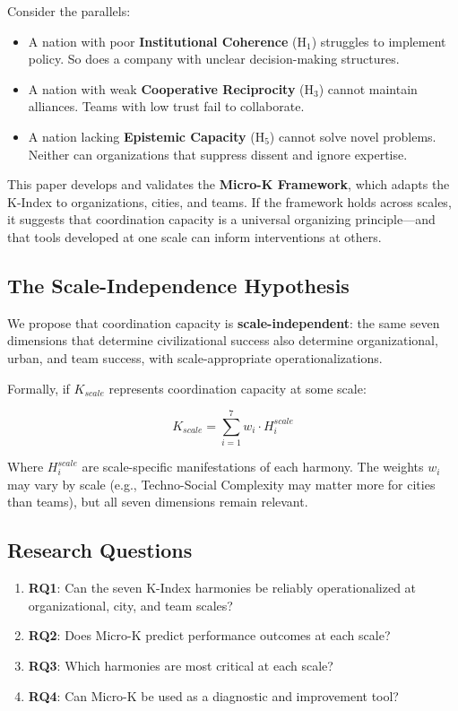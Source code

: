 \documentclass[12pt,a4paper]{article}
\begin{document}
Consider the parallels:

\begin{itemize}
    \item A nation with poor \textbf{Institutional Coherence} (H$_1$) struggles to implement policy. So does a company with unclear decision-making structures.
    \item A nation with weak \textbf{Cooperative Reciprocity} (H$_3$) cannot maintain alliances. Teams with low trust fail to collaborate.
    \item A nation lacking \textbf{Epistemic Capacity} (H$_5$) cannot solve novel problems. Neither can organizations that suppress dissent and ignore expertise.
\end{itemize}

This paper develops and validates the \textbf{Micro-K Framework}, which adapts the K-Index to organizations, cities, and teams. If the framework holds across scales, it suggests that coordination capacity is a universal organizing principle---and that tools developed at one scale can inform interventions at others.

\subsection{The Scale-Independence Hypothesis}

We propose that coordination capacity is \textbf{scale-independent}: the same seven dimensions that determine civilizational success also determine organizational, urban, and team success, with scale-appropriate operationalizations.

Formally, if $K_{scale}$ represents coordination capacity at some scale:

\begin{equation}
K_{scale} = \sum_{i=1}^{7} w_i \cdot H_i^{scale}
\end{equation}

Where $H_i^{scale}$ are scale-specific manifestations of each harmony. The weights $w_i$ may vary by scale (e.g., Techno-Social Complexity may matter more for cities than teams), but all seven dimensions remain relevant.

\subsection{Research Questions}

\begin{enumerate}
    \item \textbf{RQ1}: Can the seven K-Index harmonies be reliably operationalized at organizational, city, and team scales?
    \item \textbf{RQ2}: Does Micro-K predict performance outcomes at each scale?
    \item \textbf{RQ3}: Which harmonies are most critical at each scale?
    \item \textbf{RQ4}: Can Micro-K be used as a diagnostic and improvement tool?
\end{enumerate}
\end{document}

